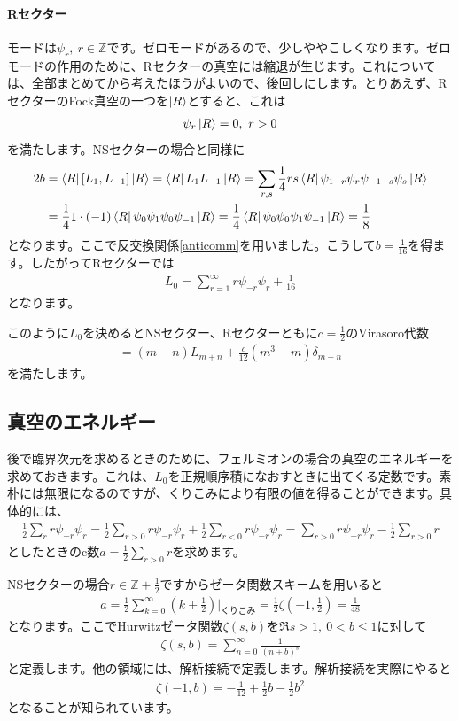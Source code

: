 \documentclass[report,paper=a4, fontsize=12pt, line_length=16cm, number_of_lines=34,dvipdfmx]{jlreq}
\numberwithin{equation}{chapter}
\numberwithin{equation}{section}
\newcommand{\Zb}{\mathbb{Z}}
\begin{document}
\paragraph{Rセクター}
モードは$\psi_{r},\ r\in \Zb$です。ゼロモードがあるので、少しややこしくなります。ゼロモードの作用のために、Rセクターの真空には縮退が生じます。これについては、全部まとめてから考えたほうがよいので、後回しにします。とりあえず、RセクターのFock真空の一つを$\ket{R}$とすると、これは
\begin{align}
  \psi_{r}\ket{R}=0,\ r>0
\end{align}
を満たします。NSセクターの場合と同様に
\begin{align}
  2b&=\bra{R}[L_{1},L_{-1}]\ket{R}
  =\bra{R}L_{1}L_{-1}\ket{R}
  =\sum_{r,s}\frac14rs\bra{R}\psi_{1-r}\psi_{r}\psi_{-1-s}\psi_{s}\ket{R}\nonumber\\
  &
  =\frac14 1\cdot (-1)\bra{R}\psi_{0}\psi_{1}\psi_{0}\psi_{-1}\ket{R}
  =\frac14 \bra{R}\psi_{0}\psi_{0}\psi_{1}\psi_{-1}\ket{R}
  =\frac{1}{8}
\end{align}
となります。ここで反交換関係\eqref{anticomm}を用いました。こうして$b=\frac{1}{16}$を得ます。したがってRセクターでは
\begin{align}
  L_0=\sum_{r=1}^{\infty} r\psi_{-r}\psi_{r}
  +\frac{1}{16}
\end{align}
となります。

このように$L_0$を決めるとNSセクター、Rセクターともに$c=\frac12$のVirasoro代数
\begin{align}
  [L_m,L_n]=(m-n)L_{m+n}+\frac{c}{12}(m^3-m)\delta_{m+n}
\end{align}
を満たします。

\subsection{真空のエネルギー}
後で臨界次元を求めるときのために、フェルミオンの場合の真空のエネルギーを求めておきます。これは、$L_0$を正規順序積になおすときに出てくる定数です。素朴には無限になるのですが、くりこみにより有限の値を得ることができます。具体的には、
\begin{align}
  \frac12\sum_{r}r\psi_{-r}\psi_{r}
  =
  \frac 12 \sum_{r>0}r\psi_{-r}\psi_{r}
  +  \frac 12 \sum_{r<0}r\psi_{-r}\psi_{r}
  =\sum_{r>0}r\psi_{-r}\psi_{r}-\frac12 \sum_{r>0}r
\end{align}
としたときのc数$a=\frac12 \sum_{r>0}r$を求めます。

NSセクターの場合$r\in \Zb+\frac12$ですからゼータ関数スキームを用いると
\begin{align}
 a=\frac12 \sum_{k=0}^{\infty}(k+\frac12)\Bigg|_{\text{くりこみ}}=\frac12 \zeta(-1,\frac12)=
 \frac{1}{48}\label{aNSfermion1}
\end{align}
となります。ここでHurwitzゼータ関数$\zeta(s,b)$を$\Re s >1,\ 0< b \le 1$に対して
\begin{align}
  \zeta(s,b)=\sum_{n=0}^{\infty}\frac{1}{(n+b)^s}\label{zetafunction}
\end{align}
と定義します。他の領域には、解析接続で定義します。解析接続を実際にやると
\begin{align}
  \zeta(-1,b)=-\frac{1}{12}+\frac12 b -\frac12 b^2\label{zetavalue}
\end{align}
となることが知られています。
\end{document}
